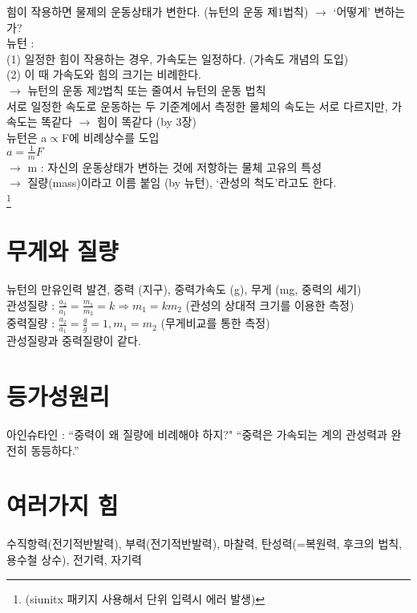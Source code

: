 \documentclass[10pt,a4paper]{report}
\begin{document}
	힘이 작용하면 물제의 운동상태가 변한다. (뉴턴의 운동 제1법칙) $\rightarrow$ `어떻게' 변하는가?\\
	뉴턴 :\\
	(1) 일정한 힘이 작용하는 경우, 가속도는 일정하다. (가속도 개념의 도입)\\
	(2) 이 때 가속도와 힘의 크기는 비례한다.\\
	$\rightarrow$ 뉴턴의 운동 제2법칙 또는 줄여서 뉴턴의 운동 법칙\\
	서로 일정한 속도로 운동하는 두 기준계에서 측정한 물체의 속도는 서로 다르지만, 가속도는 똑같다 $\rightarrow$ 힘이 똑같다 (by 3장)\\
	뉴턴은 a$\propto$F에 비례상수를 도입\\
	$a=\frac{1}{m}F$\\
	$\rightarrow$ m : 자신의 운동상태가 변하는 것에 저항하는 물체 고유의 특성\\
	$\rightarrow$ 질량(mass)이라고 이름 붙임 (by 뉴턴), `관성의 척도'라고도 한다.\\
	\footnote{(siunitx 패키지 사용해서 단위 입력시 에러 발생)}
	
	\section{무게와 질량}
	
	뉴턴의 만유인력 발견, 중력 (지구), 중력가속도 (g), 무게 (mg, 중력의 세기)\\
	관성질량 : $\frac{a_2}{a_1} = \frac{m_1}{m_2} = k \Rightarrow m_1 = k m_2$ (관성의 상대적 크기를 이용한 측정)\\
	중력질량 : $\frac{a_2}{a_1} = \frac{g}{g} = 1, m_1 = m_2$ (무게비교를 통한 측정)\\
	관성질량과 중력질량이 같다.
	
	\section{등가성원리}
	
	아인슈타인 : ``중력이 왜 질량에 비례해야 하지?" ``중력은 가속되는 계의 관성력과 완전히 동등하다.''
	
	\section{여러가지 힘}
	
	수직항력(전기적반발력), 부력(전기적반발력), 마찰력, 탄성력(=복원력, 후크의 법칙, 용수철 상수), 전기력, 자기력
	
\end{document}
